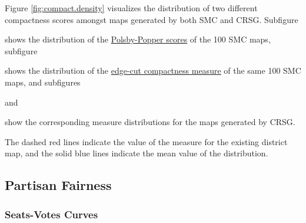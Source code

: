 Figure \ref{fig:compact.density} visualizes the distribution of two different compactness scores amongst maps generated by both SMC and CRSG. Subfigure
\begin{seriate} 
    \item shows the distribution of the \hyperref[sec:polsbypopper]{Polsby-Popper scores} of the 100 SMC maps, subfigure
    \item shows the distribution of the \hyperref[sec:edgecut]{edge-cut compactness measure} of the same 100 SMC maps, and subfigures
    \item and 
    \item show the corresponding measure distributions for the maps generated by CRSG. 
\end{seriate}
The dashed red lines indicate the value of the measure for the existing district map, and the solid blue lines indicate the mean value of the distribution. 

\subsection{Partisan Fairness}

\subsubsection{Seats-Votes Curves}

